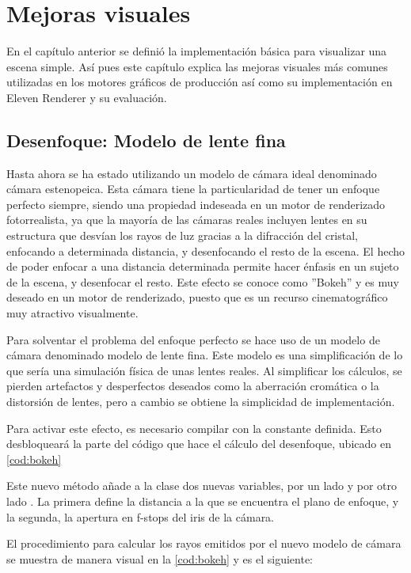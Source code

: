 \chapter{Mejoras visuales}
				
En el capítulo anterior se definió la implementación básica para visualizar una escena simple. Así pues este capítulo explica las mejoras visuales más comunes utilizadas en los motores gráficos de producción así como su implementación en Eleven Renderer y su evaluación.
	
\section{Desenfoque: Modelo de lente fina}
	
Hasta ahora se ha estado utilizando un modelo de cámara ideal denominado cámara estenopeica. Esta cámara tiene la particularidad de tener un enfoque perfecto siempre, siendo una propiedad indeseada en un motor de renderizado fotorrealista, ya que la mayoría de las cámaras reales incluyen lentes en su estructura que desvían los rayos de luz gracias a la difracción del cristal, enfocando a determinada distancia, y desenfocando el resto de la escena. El hecho de poder enfocar a una distancia determinada permite hacer énfasis en un sujeto de la escena, y desenfocar el resto. Este efecto se conoce como ''Bokeh'' y es muy deseado en un motor de renderizado, puesto que es un recurso cinematográfico muy atractivo visualmente.

Para solventar el problema del enfoque perfecto se hace uso de un modelo de cámara denominado modelo de lente fina. Este modelo es una simplificación de lo que sería una simulación física de unas lentes reales. Al simplificar los cálculos, se pierden artefactos y desperfectos deseados como la aberración cromática o la distorsión de lentes, pero a cambio se obtiene la simplicidad de implementación.

Para activar este efecto, es necesario compilar con la constante  definida. Esto desbloqueará la parte del código que hace el cálculo del desenfoque, ubicado en \autoref{cod:bokeh} 
	
Este nuevo método añade a la clase  dos nuevas variables, por un lado  y por otro lado . La primera define la distancia a la que se encuentra el plano de enfoque, y la segunda, la apertura en f-stops del iris de la cámara. 

El procedimiento para calcular los rayos emitidos por el nuevo modelo de cámara se muestra de manera visual en la \autoref{cod:bokeh} y es el siguiente:

